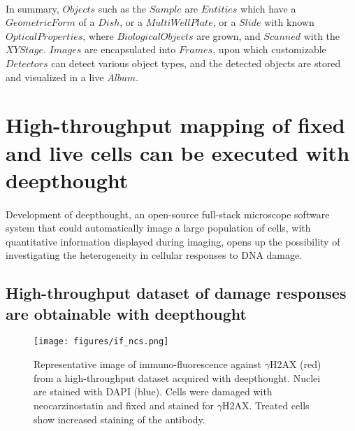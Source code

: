 \paragraph*{} In summary, $Objects$ such as the $Sample$ are $Entities$ which have a $GeometricForm$ of a $Dish$, or a $MultiWellPlate$, or a $Slide$ with known $OpticalProperties$, where $BiologicalObjects$ are grown, and $Scanned$ with the $XYStage$. $Images$ are encapsulated into $Frames$, upon which customizable $Detectors$ can detect various object types, and the detected objects are stored and visualized in a live $Album$.

\section{High-throughput mapping of fixed and live cells can be executed with deepthought}
\paragraph*{} Development of deepthought, an open-source full-stack microscope software system that could automatically image a large population of cells, with quantitative information displayed during imaging, opens up the possibility of investigating the heterogeneity in cellular responses to DNA damage.

\subsection{High-throughput dataset of damage responses are obtainable with deepthought}
\begin{figure}[h]
    {\hfill\texttt{[image: figures/if\_ncs.png]}\hspace*{\fill}}
    \caption{Representative image of immuno-fluorescence against $\gamma$H2AX (red) from a high-throughput dataset acquired with deepthought. Nuclei are stained with DAPI (blue). Cells were damaged with neocarzinostatin and fixed and stained for $\gamma$H2AX. Treated cells show increased staining of the antibody. }
    {\label{fig:ncs_ht}}
\end{figure}

